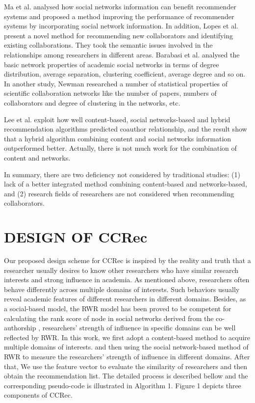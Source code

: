 \documentclass{acm_proc_article-sp}
\begin{document}
Ma et al. analysed how social networks information can benefit recommender systems and proposed a method improving the performance of recommender systems by incorporating social network information. In addition, Lopes et al. present a novel method for recommending new collaborators and identifying existing collaborations. They took the semantic issues involved in the relationships among researchers in different areas. Barabasi et al. analysed the basic network properties of academic social networks in terms of degree distribution, average separation, clustering coefficient, average degree and so on. In another study, Newman researched a number of statistical properties of scientific collaboration networks like the number of papers, numbers of collaborators and degree of clustering in the networks, etc.

Lee et al. exploit how well content-based, social networks-based and hybrid recommendation algorithms predicted coauthor relationship, and the result show that a hybrid algorithm combining content and social networks information outperformed better. Actually, there is not much work for the combination of content and networks.

In summary, there are two deficiency not considered by traditional studies: (1) lack of a better integrated method combining content-based and networks-based, and (2) research fields of researchers are not considered when recommending collaborators.
\section{DESIGN OF CCRec}
Our proposed design scheme for CCRec is inspired by the reality and truth that a researcher usually desires to know other researchers who have similar research interests and strong influence in academia. As mentioned above, researchers often behave differently across multiple domains of interests. Such behaviors usually reveal academic features of different researchers in different domains. Besides, as a social-based model, the RWR model has been proved to be competent for calculating the rank score of node in social networks derived from the co-authorship \cite{li2014acrec}, researchers' strength of influence in specific domains can be well reflected by RWR. In this work, we first adopt a content-based method to acquire multiple domains of interests. and then using the social network-based method of RWR to measure the researchers' strength of influence in different domains. After that, We use the feature vector to evaluate the similarity of researchers and then obtain the recommendation list. The detailed process is described bellow and the corresponding pseudo-code is illustrated in Algorithm 1. Figure 1 depicts three components of CCRec.
\end{document}
